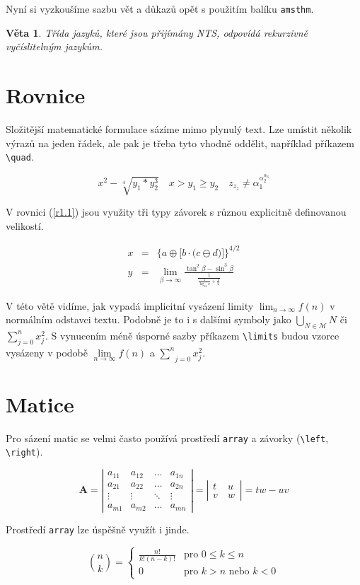 \documentclass[a4paper, 11pt, twocolumn]{article}
\theoremstyle{definition}
\theoremstyle{plain}
\newtheorem{theorem}{Věta}
\begin{document}
Nyní si vyzkoušíme sazbu vět a důkazů opět s použitím balíku \verb|amsthm|.
\begin{theorem}
    Třída jazyků, které jsou přijímány NTS, odpovídá \emph{rekurzivně vyčíslitelným jazykům}.
\end{theorem}

\section{Rovnice}
Složitější matematické formulace sázíme mimo plynulý text. Lze umístit několik výrazů na jeden řádek, ale pak je třeba tyto vhodně oddělit, například příkazem \verb|\quad|.

$$ x^2 - \sqrt[4]{y_1 \ast y^3_2} \quad x > y_1 \geq y_2 \quad z_{z_z} \neq \alpha_1^{\alpha_2^{\alpha_3}}$$

V rovnici (\ref{r1.1}) jsou využity tři typy závorek s různou explicitně definovanou velikostí.

\begin{eqnarray}
	\label{r1.1} x & = & \bigg\{a \oplus \Big[ b \cdot \big(c \ominus d\big) \Big] \bigg\}^{4/2}\\
	\label{r1} y & = & \lim_{\beta\to\infty} \frac{\tan^2\beta - \sin^3\beta}{\frac{1}{\frac{1}{\log_{42} x} + \frac{1}{2}}}
\end{eqnarray}

V této větě vidíme, jak vypadá implicitní vysázení limity $\lim_{n\to\infty} f(n)$ v normálním odstavci textu. Podobně je to i s dalšími symboly jako $\bigcup_{N \in \mathcal{M}}N$ či $\sum^{n}_{j=0} x^2_j$. 
S vynucením méně úsporné sazby příkazem \verb|\limits| budou vzorce vysázeny v podobě $\lim\limits_{n\to\infty} f(n)$ a $\underset{j=0}{\overset{n}{\sum}} x^2_j$. 

\section{Matice}
Pro sázení matic se velmi často používá prostředí \verb|array| a závorky (\verb|\left|, \verb|\right|).

$$
\mathbf{A} =
\left|
\begin{array}{cccc}
	a_{11} & a_{12} & \ldots & a_{1n} \\
	a_{21} & a_{22} & \ldots & a_{2n} \\
	\vdots & \vdots & \ddots & \vdots \\
	a_{m1} & a_{m2} & \ldots & a_{mn}
\end{array}
\right|
=
\left|
\begin{array}{cc}
	t & u~\\
	v~& w
\end{array}
\right|
= tw - uv
$$

Prostředí \verb|array| lze úspěšně využít i jinde.

$$
\binom{n}{k} =
\left\{
\begin{array}{cl}
	\frac{n!}{k! (n - k)!} & \text{pro } 0 \leq k \leq n \\
	0 & \text{pro } k > n \text{ nebo } k < 0
\end{array}
\right.
$$
\end{document}

